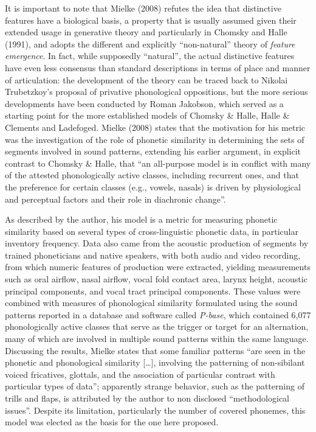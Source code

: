 \documentclass[a4paper]{article}
\begin{document}
It is important to note that Mielke (2008) refutes the idea that
distinctive features have a biological basis, a property that is usually
assumed given their extended usage in generative theory and particularly
in Chomsky and Halle (1991), and adopts the different and explicitly
``non-natural'' theory of \emph{feature emergence}. In fact, while
supposedly ``natural'', the actual distinctive features have even less
consensus than standard descriptions in terms of place and manner of
articulation: the development of the theory can be traced back to
Nikolai Trubetzkoy's proposal of privative phonological oppositions, but
the more serious developments have been conducted by Roman Jakobson,
which served as a starting point for the more established models of
Chomsky \& Halle, Halle \& Clements and Ladefoged. Mielke (2008) states
that the motivation for his metric was the investigation of the role of
phonetic similarity in determining the sets of segments involved in
sound patterns, extending his earlier argument, in explicit contrast to
Chomsky \& Halle, that ``an all-purpose model is in conflict with many
of the attested phonologically active classes, including recurrent ones,
and that the preference for certain classes (e.g., vowels, nasals) is
driven by physiological and perceptual factors and their role in
diachronic change''.

As described by the author, his model is a metric for measuring phonetic
similarity based on several types of cross-linguistic phonetic data, in
particular inventory frequency. Data also came from the acoustic
production of segments by trained phoneticians and native speakers, with
both audio and video recording, from which numeric features of
production were extracted, yielding measurements such as oral airflow,
nasal airflow, vocal fold contact area, larynx height, acoustic
principal components, and vocal tract principal components. These values
were combined with measures of phonological similarity formulated using
the sound patterns reported in a database and software called
\emph{P-base}, which contained 6,077 phonologically active classes that
serve as the trigger or target for an alternation, many of which are
involved in multiple sound patterns within the same language. Discussing
the results, Mielke states that some familiar patterns ``are seen in the
phonetic and phonological similarity {[}\ldots{}{]}, involving the
patterning of non-sibilant voiced fricatives, glottals, and the
association of particular contrast with particular types of data'';
apparently strange behavior, such as the patterning of trills and flaps,
is attributed by the author to non disclosed ``methodological issues''.
Despite its limitation, particularly the number of covered phonemes,
this model was elected as the basis for the one here proposed.
\end{document}
